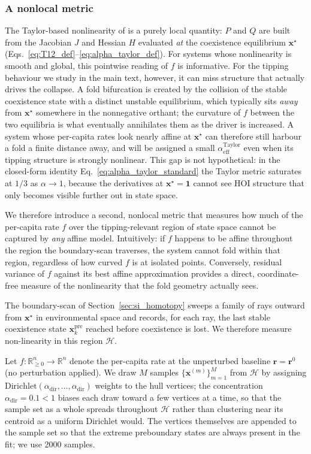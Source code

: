 \documentclass[pdflatex,sn-mathphys-num]{sn-jnl}%
\begin{document}
\subsubsection{A nonlocal metric}
\label{sec:alpha_hull}

The Taylor-based nonlinearity of is a purely local quantity: $P$ and $Q$ are built from the Jacobian $J$ and Hessian $H$ evaluated \emph{at} the coexistence equilibrium $\mathbf{x}^\star$ (Eqs.~\eqref{eq:T12_def}--\eqref{eq:alpha_taylor_def}). For systems whose nonlinearity is smooth and global, this pointwise reading of $f$ is informative. For the tipping behaviour we study in the main text, however, it can miss structure that actually drives the collapse. A fold bifurcation is created by the collision of the stable coexistence state with a distinct unstable equilibrium, which typically sits \emph{away} from $\mathbf{x}^\star$ somewhere in the nonnegative orthant; the curvature of $f$ between the two equilibria is what eventually annihilates them as the driver is increased. A system whose per-capita rates look nearly affine at $\mathbf{x}^\star$ can therefore still harbour a fold a finite distance away, and will be assigned a small $\alpha^{\mathrm{Taylor}}_{\mathrm{eff}}$ even when its tipping structure is strongly nonlinear. This gap is not hypothetical: in the closed-form identity Eq.~\eqref{eq:alpha_taylor_standard} the Taylor metric saturates at $1/3$ as $\alpha \to 1$, because the derivatives at $\mathbf{x}^\star = \mathbf{1}$ cannot see HOI structure that only becomes visible further out in state space.

We therefore introduce a second, nonlocal metric that measures how much of the per-capita rate $f$ over the tipping-relevant region of state space cannot be captured by \emph{any} affine model. Intuitively: if $f$ happens to be affine throughout the region the boundary-scan traverses, the system cannot fold within that region, regardless of how curved $f$ is at isolated points. Conversely, residual variance of $f$ against its best affine approximation provides a direct, coordinate-free measure of the nonlinearity that the fold geometry actually sees.

The boundary-scan of Section~\ref{sec:si_homotopy} sweeps a family of rays outward from $\mathbf{x}^\star$ in environmental space and records, for each ray, the last stable coexistence state $\mathbf{x}^{\mathrm{pre}}_k$ reached before coexistence is lost. We therefore measure non-linearity in this region $\mathcal{H}$.

Let $f : \mathbb{R}^n_{\ge 0} \to \mathbb{R}^n$ denote the per-capita rate at the unperturbed baseline $\mathbf{r} = \mathbf{r}^0$ (no perturbation applied). We draw $M$ samples $\{\mathbf{x}^{(m)}\}_{m=1}^{M}$ from $\mathcal{H}$ by assigning $\mathrm{Dirichlet}(\alpha_\mathrm{dir},\ldots,\alpha_\mathrm{dir})$ weights to the hull vertices; the concentration $\alpha_\mathrm{dir} = 0.1 < 1$ biases each draw toward a few vertices at a time, so that the sample set as a whole spreads throughout $\mathcal{H}$ rather than clustering near its centroid as a uniform Dirichlet would. The vertices themselves are appended to the sample set so that the extreme preboundary states are always present in the fit; we use 2000 samples.
\end{document}

